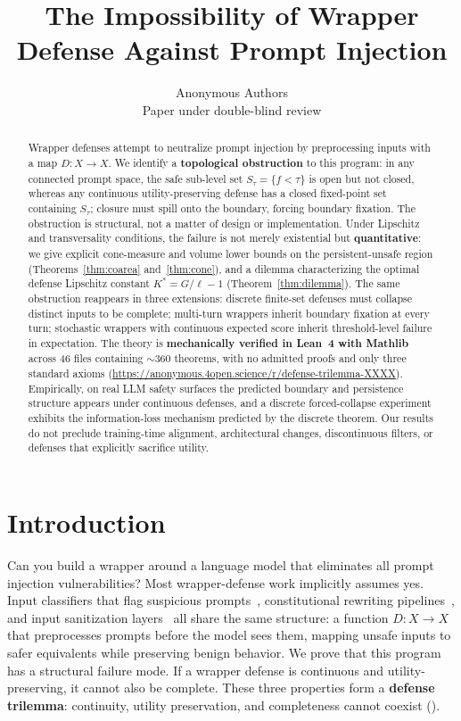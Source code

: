 \documentclass[11pt]{article}
\title{The Impossibility of Wrapper Defense Against Prompt Injection}
\author{%
  Anonymous Authors\\
  Paper under double-blind review\\
}
\date{}
\begin{document}
\maketitle
\begin{abstract}
Wrapper defenses attempt to neutralize prompt injection by preprocessing
inputs with a map $D\colon X \to X$. We identify a \textbf{topological
obstruction} to this program: in any connected prompt space, the safe
sub-level set $S_\tau = \{f < \tau\}$ is open but not closed, whereas
any continuous utility-preserving defense has a closed fixed-point set
containing $S_\tau$; closure must spill onto the boundary, forcing
boundary fixation. The obstruction is structural, not a matter of
design or implementation. Under Lipschitz and transversality
conditions, the failure is not merely existential but
\textbf{quantitative}: we give explicit cone-measure and volume lower
bounds on the persistent-unsafe region (Theorems~\ref{thm:coarea}
and~\ref{thm:cone}), and a dilemma characterizing the optimal defense
Lipschitz constant $K^* = G/\ell - 1$ (Theorem~\ref{thm:dilemma}). The
same obstruction reappears in three extensions: discrete finite-set
defenses must collapse distinct inputs to be complete; multi-turn
wrappers inherit boundary fixation at every turn; stochastic wrappers
with continuous expected score inherit threshold-level failure in
expectation. The theory is \textbf{mechanically verified in Lean~4
with Mathlib} across 46 files containing ${\sim}360$ theorems, with no
admitted proofs and only three standard axioms
(\url{https://anonymous.4open.science/r/defense-trilemma-XXXX}).
Empirically, on real LLM safety surfaces the predicted boundary and
persistence structure appears under continuous defenses, and a
discrete forced-collapse experiment exhibits the information-loss
mechanism predicted by the discrete theorem. Our results do not
preclude training-time alignment, architectural changes, discontinuous
filters, or defenses that explicitly sacrifice utility.
\end{abstract}


\section{Introduction}
\label{sec:intro}

Can you build a wrapper around a language model that eliminates all
prompt injection vulnerabilities? Most wrapper-defense work implicitly
assumes yes. Input classifiers that flag suspicious
prompts~\cite{alon2023detecting}, constitutional rewriting
pipelines~\cite{bai2022constitutional}, and input sanitization
layers~\cite{inan2023llama} all share the same structure: a
function $D\colon X \to X$ that preprocesses prompts before the model
sees them, mapping unsafe inputs to safer equivalents while preserving
benign behavior. We prove that this program has a structural failure
mode. If a wrapper defense is continuous and utility-preserving, it
cannot also be complete. These three properties form a
\textbf{defense trilemma}: continuity, utility preservation, and
completeness cannot coexist ().
\end{document}
